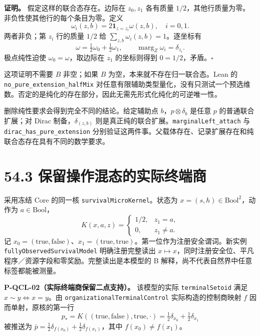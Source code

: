 \documentclass[
  11pt,
  oneside]{book}
\begin{document}
\textbf{证明。} 假定这样的联合态存在。边际在 \(z_0,z_1\) 各有质量
\(1/2\)，其他行质量为零。非负性使其他行的每个条目为零。定义 \[
\omega_i(z,b)=2\mathbf1_{z=z_i}\omega(z,b),\quad i=0,1.
\] 两者非负；第 \(z_i\) 行的质量 \(1/2\) 给
\(\sum_{z,b}\omega_i(z,b)=1\)。逐坐标有 \[
\omega=\tfrac12\omega_0+\tfrac12\omega_1,
\qquad \operatorname{marg}_Z\omega_i=\delta_{z_i}.
\] 极点纯性迫使 \(\omega_0=\omega\)，取边际在 \(z_1\) 的坐标则得到
\(0=1/2\)，矛盾。\(\square\)

这项证明不需要 \(B\) 非空；如果 \(B\) 为空，本来就不存在归一联合态。Lean
的 \texttt{no\_\allowbreak pure\_\allowbreak extension\_\allowbreak halfMix}
对任意有限辅助类型量化，没有只测试一个预选维数。否定的是纯化的存在部分，因此无需先形式化纯化的可逆唯一性。

删除纯性要求会得到完全不同的结论。给定辅助点 \(b\)，\(p\otimes\delta_b\)
是任意 \(p\) 的普通联合扩展；对 Dirac 制备，\(\delta_{(z,b)}\)
则是真正纯的联合扩展。\texttt{marginalLeft\_\allowbreak attach} 与
\texttt{dirac\_\allowbreak has\_\allowbreak pure\_\allowbreak extension}
分别验证这两件事。父载体存在、记录扩展存在和纯联合态存在具有不同的数学要求。

\hypertarget{ux4fddux7559ux64cdux4f5cux6df7ux6001ux7684ux5b9eux9645ux7ec8ux7aefux5546}{%
\section{54.3
保留操作混态的实际终端商}\label{ux4fddux7559ux64cdux4f5cux6df7ux6001ux7684ux5b9eux9645ux7ec8ux7aefux5546}}

采用冻结 Core 的同一核 \texttt{survivalMicroKernel}。状态为
\(x=(s,h)\in\mathrm{Bool}^2\)，动作为 \(a\in\mathrm{Bool}\)， \[
K(x,a,z)=\begin{cases}1/2,&z_1=a,\\0,&z_1\ne a.\end{cases}
\] 记
\(x_0=(\mathrm{true},\mathrm{false})\)、\(x_1=(\mathrm{true},\mathrm{true})\)。第一位作为注册安全谓词。新实例
\texttt{fullyObservedSurvivalModel} 明确注册完整读出
\(x\mapsto x\)，同时注册安全位、平凡程序／资源字段和零奖励。完整读出是本模型的
B 解释，尚不代表自然界中任意标签都能被测量。

\protect\hypertarget{p-qcl-02}{}{}

\textbf{P-QCL-02（实际终端商保留二点支持）。} 该模型的实际
\texttt{terminalSetoid} 满足 \(x\sim y\iff x=y\)。由
\texttt{organizationalTerminalControl} 实际构造的控制商映射 \(f\)
因而单射，原核的第一行 \[
p_* = K((\mathrm{true},\mathrm{false}),\mathrm{true},\cdot)
=\tfrac12\delta_{x_0}+\tfrac12\delta_{x_1}
\] 被推送为
\(\bar p=\tfrac12\delta_{f(x_0)}+\tfrac12\delta_{f(x_1)}\)，其中
\(f(x_0)\ne f(x_1)\)。
\end{document}
